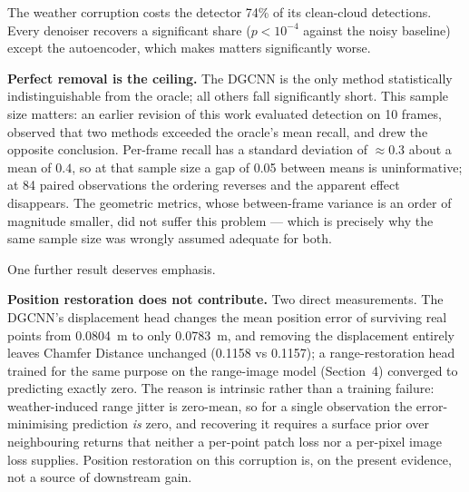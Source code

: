 \documentclass[12pt,a4paper]{article}
\begin{document}
The weather corruption costs the detector 74\% of its clean-cloud
detections. Every denoiser recovers a significant share ($p<10^{-4}$ against
the noisy baseline) except the autoencoder, which makes matters
significantly worse.

\textbf{Perfect removal is the ceiling.} The DGCNN is the only method
statistically indistinguishable from the oracle; all others fall
significantly short. This sample size matters: an earlier revision of this
work evaluated detection on 10 frames, observed that two methods exceeded
the oracle's mean recall, and drew the opposite conclusion. Per-frame recall
has a standard deviation of $\approx 0.3$ about a mean of $0.4$, so at that
sample size a gap of 0.05 between means is uninformative; at 84 paired
observations the ordering reverses and the apparent effect disappears. The
geometric metrics, whose between-frame variance is an order of magnitude
smaller, did not suffer this problem --- which is precisely why the same
sample size was wrongly assumed adequate for both.

One further result deserves emphasis.

\textbf{Position restoration does not contribute.} Two direct
measurements. The DGCNN's
displacement head changes the mean position error of surviving real points
from 0.0804~m to only 0.0783~m, and removing the displacement entirely
leaves Chamfer Distance unchanged (0.1158 vs 0.1157); a range-restoration
head trained for the same purpose on the range-image model (Section~4)
converged to predicting exactly zero. The reason is intrinsic rather than a
training failure: weather-induced range jitter is zero-mean, so for a single
observation the error-minimising prediction \emph{is} zero, and recovering
it requires a surface prior over neighbouring returns that neither a
per-point patch loss nor a per-pixel image loss supplies. Position
restoration on this corruption is, on the present evidence, not a source of
downstream gain.
\end{document}
